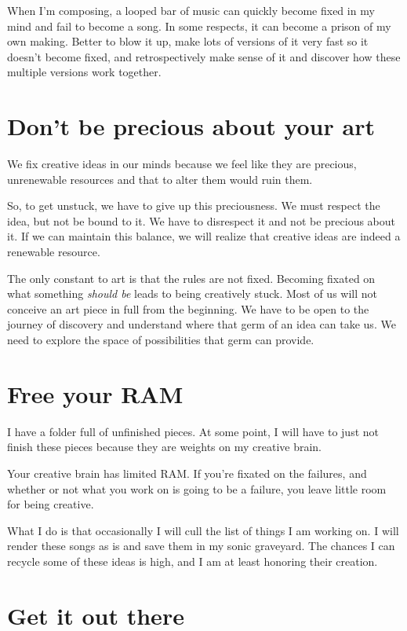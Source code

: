 \documentclass[
]{book}
\begin{document}
When I'm composing, a looped bar of music can quickly become fixed in my mind and fail to become a song. In some respects, it can become a prison of my own making. Better to blow it up, make lots of versions of it very fast so it doesn't become fixed, and retrospectively make sense of it and discover how these multiple versions work together.

\hypertarget{dont-be-precious-about-your-art}{%
\section{Don't be precious about your art}\label{dont-be-precious-about-your-art}}

We fix creative ideas in our minds because we feel like they are precious, unrenewable resources and that to alter them would ruin them.

So, to get unstuck, we have to give up this preciousness. We must respect the idea, but not be bound to it. We have to disrespect it and not be precious about it. If we can maintain this balance, we will realize that creative ideas are indeed a renewable resource.

The only constant to art is that the rules are not fixed. Becoming fixated on what something \emph{should be} leads to being creatively stuck. Most of us will not conceive an art piece in full from the beginning. We have to be open to the journey of discovery and understand where that germ of an idea can take us. We need to explore the space of possibilities that germ can provide.

\hypertarget{free-your-ram}{%
\section{Free your RAM}\label{free-your-ram}}

I have a folder full of unfinished pieces. At some point, I will have to just not finish these pieces because they are weights on my creative brain.

Your creative brain has limited RAM. If you're fixated on the failures, and whether or not what you work on is going to be a failure, you leave little room for being creative.

What I do is that occasionally I will cull the list of things I am working on. I will render these songs as is and save them in my sonic graveyard. The chances I can recycle some of these ideas is high, and I am at least honoring their creation.

\hypertarget{get-it-out-there}{%
\section{Get it out there}\label{get-it-out-there}}
\end{document}

